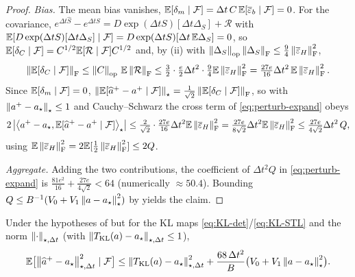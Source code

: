 \begin{proof}
\emph{Bias.} The mean bias vanishes, $\mathbb{E}[\delta_m\mid\mathcal{F}]=\Delta t\,C\,\mathbb{E}[\overline\varepsilon_b\mid\mathcal{F}]=0$.
For the covariance, $e^{\Delta t\widehat S}-e^{\Delta tS}=D\exp(\Delta tS)[\Delta t\Delta_S]+\mathcal R$
with $\mathbb{E}[D\exp(\Delta tS)[\Delta t\Delta_S]\mid\mathcal{F}]=D\exp(\Delta tS)[\Delta t\,\mathbb{E}\Delta_S]=0$, so
$\mathbb{E}[\delta_C\mid\mathcal{F}]=C^{1/2}\mathbb{E}[\mathcal R\mid\mathcal{F}]C^{1/2}$ and, by (ii) with
$\left\lVert \Delta_S\right\rVert_{\mathrm{op}}\left\lVert \Delta_S\right\rVert_{\mathrm{F}}\leq\tfrac94\left\lVert \overline\varepsilon_H\right\rVert_{\mathrm{F}}^2$,
\[
    \left\lVert \mathbb{E}[\delta_C\mid\mathcal{F}]\right\rVert_{\mathrm{F}}\leq\left\lVert C\right\rVert_{\mathrm{op}}\,\mathbb{E}\left\lVert \mathcal R\right\rVert_{\mathrm{F}}
    \leq\tfrac32\cdot\tfrac e2\Delta t^2\cdot\tfrac94\mathbb{E}\left\lVert \overline\varepsilon_H\right\rVert_{\mathrm{F}}^2
    =\tfrac{27e}{16}\Delta t^2\,\mathbb{E}\left\lVert \overline\varepsilon_H\right\rVert_{\mathrm{F}}^2 .
\]
Since $\mathbb{E}[\delta_m\mid\mathcal{F}]=0$, $\left\lVert \mathbb{E}[\widehat a^+-a^+\mid\mathcal{F}]\right\rVert_\star=\tfrac1{\sqrt2}\left\lVert \mathbb{E}[\delta_C\mid\mathcal{F}]\right\rVert_{\mathrm{F}}$,
so with $\left\lVert a^+-a_\star\right\rVert_\star\leq1$ and Cauchy--Schwarz the cross term of
\eqref{eq:perturb-expand} obeys
\[
    2\,\bigl|\left\langle a^+-a_\star,\mathbb{E}[\widehat a^+-a^+\mid\mathcal{F}]\right\rangle_\star\bigr|
    \leq\tfrac{2}{\sqrt2}\cdot\tfrac{27e}{16}\Delta t^2\mathbb{E}\left\lVert \overline\varepsilon_H\right\rVert_{\mathrm{F}}^2
    =\tfrac{27e}{8\sqrt2}\Delta t^2\mathbb{E}\left\lVert \overline\varepsilon_H\right\rVert_{\mathrm{F}}^2
    \leq\tfrac{27e}{4\sqrt2}\Delta t^2\,Q,
\]
using $\mathbb{E}\left\lVert \overline\varepsilon_H\right\rVert_{\mathrm{F}}^2=2\mathbb{E}[\tfrac12\left\lVert \overline\varepsilon_H\right\rVert_{\mathrm{F}}^2]\leq2Q$.

\emph{Aggregate.} Adding the two contributions, the coefficient of $\Delta t^2Q$ in
\eqref{eq:perturb-expand} is $\tfrac{81e^2}{16}+\tfrac{27e}{4\sqrt2}<64$ (numerically $\approx50.4$).
Bounding $Q\leq B^{-1}(V_0+V_1\left\lVert a-a_\star\right\rVert_\star^2)$ by  yields the claim.
\end{proof}

\begin{lemma}
\label{lem:local-perturb-KL}
Under the hypotheses of  but for the KL maps
\eqref{eq:KL-det}/\eqref{eq:KL-STL} and the norm $\left\lVert \cdot\right\rVert_{\star,\Delta t}$ (with
$\left\lVert T_{\mathrm{KL}}(a)-a_\star\right\rVert_{\star,\Delta t}\leq1$),
\[
    \mathbb{E}\bigl[\left\lVert \widehat a^+-a_\star\right\rVert_{\star,\Delta t}^2\mid\mathcal{F}\bigr]
    \leq\left\lVert T_{\mathrm{KL}}(a)-a_\star\right\rVert_{\star,\Delta t}^2+\frac{68\,\Delta t^2}{B}\bigl(V_0+V_1\left\lVert a-a_\star\right\rVert_\star^2\bigr).
\]
\end{lemma}

